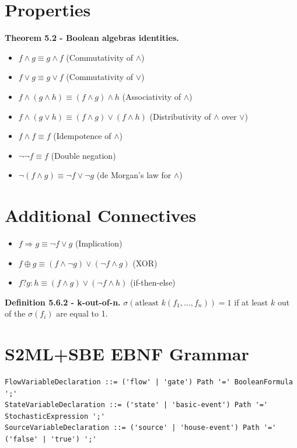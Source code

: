 \section{Properties}
\textbf{Theorem 5.2 - Boolean algebras identities.}
\begin{itemize}
    \item $f \wedge g \equiv g \wedge f$ (Commutativity of $\wedge$)
    \item $f \vee g \equiv g \vee f$ (Commutativity of $\vee$)
    \item $f \wedge (g \wedge h) \equiv (f \wedge g) \wedge h$ (Associativity of $\wedge$)
    \item $f \wedge (g \vee h) \equiv (f \wedge g) \vee (f \wedge h)$ (Distributivity of $\wedge$ over $\vee$)
    \item $f \wedge f \equiv f$ (Idempotence of $\wedge$)
    \item $\neg \neg f \equiv f$ (Double negation)
    \item $\neg (f \wedge g) \equiv \neg f \vee \neg g$ (de Morgan's law for $\wedge$)
\end{itemize}

\section{Additional Connectives}
\begin{itemize}
    \item $f \Rightarrow g \equiv \neg f \vee g$ (Implication)
    \item $f \oplus g \equiv (f \wedge \neg g) \vee (\neg f \wedge g)$ (XOR)
    \item $f ? g : h \equiv (f \wedge g) \vee (\neg f \wedge h)$ (if-then-else)
\end{itemize}

\textbf{Definition 5.6.2 - k-out-of-n.} $\sigma(\text{atleast } k(f_1, \dots, f_n)) = 1$ if at least $k$ out of the $\sigma(f_i)$ are equal to 1.

\section{S2ML+SBE EBNF Grammar}
\begin{lstlisting}
FlowVariableDeclaration ::= ('flow' | 'gate') Path '=' BooleanFormula ';'
StateVariableDeclaration ::= ('state' | 'basic-event') Path '=' StochasticExpression ';'
SourceVariableDeclaration ::= ('source' | 'house-event') Path '=' ('false' | 'true') ';'
\end{lstlisting}

